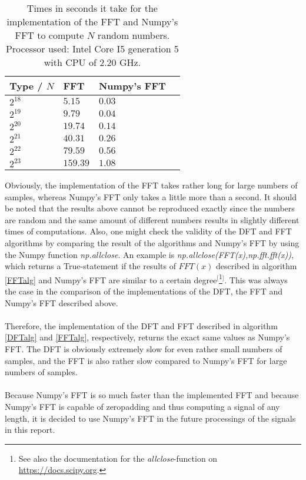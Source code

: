 \begin{table}[H]
\centering
\begin{tabular}{|l|l|l|l|}
\hline
Type / $N$ & FFT	   & Numpy's FFT \\ \hline
$2^{18}$   & $5.15$    & $0.03$ \\ \hline
$2^{19}$   & $9.79$    & $0.04$ \\ \hline
$2^{20}$   & $19.74$   & $0.14$ \\ \hline
$2^{21}$   & $40.31$   & $0.26$ \\ \hline
$2^{22}$   & $79.59$   & $0.56$ \\ \hline
$2^{23}$   & $159.39$  & $1.08$ \\ \hline
\end{tabular}
\caption{Times in seconds it take for the implementation of the FFT and Numpy's FFT to compute $N$ random numbers. Processor used: Intel Core I5 generation 5 with CPU of 2.20 GHz.}
\label{tab:FT2compare}
\end{table}

Obviously, the implementation of the FFT takes rather long for large numbers of samples, whereas Numpy's FFT only takes a little more than a second. It should be noted that the results above cannot be reproduced exactly since the numbers are random and the same amount of different numbers results in slightly different times of computations. Also, one might check the validity of the DFT and FFT algorithms by comparing the result of the algorithms and Numpy's FFT by using the Numpy function \textit{np.allclose}. An example is \textit{np.allclose(FFT(x),np.fft.fft(x))}, which returns a True-statement if the results of $FFT(x)$ described in algorithm \ref{FFTalg} and Numpy's FFT are similar to a certain degree$^[$\footnote{See also the documentation for the \textit{allclose}-function on \href{https://docs.scipy.org/doc/numpy/reference/generated/numpy.allclose.html}{https://docs.scipy.org}.}$^]$. This was always the case in the comparison of the implementations of the DFT, the FFT and Numpy's FFT described above.
\\ \\
Therefore, the implementation of the DFT and FFT described in algorithm \ref{DFTalg} and \ref{FFTalg}, respectively, returns the exact same values as Numpy's FFT. The DFT is obviously extremely slow for even rather small numbers of samples, and the FFT is also rather slow compared to Numpy's FFT for large numbers of samples.
\\ \\
Because Numpy's FFT is so much faster than the implemented FFT and because Numpy's FFT is capable of zeropadding and thus computing a signal of any length, it is decided to use Numpy's FFT in the future processings of the signals in this report.